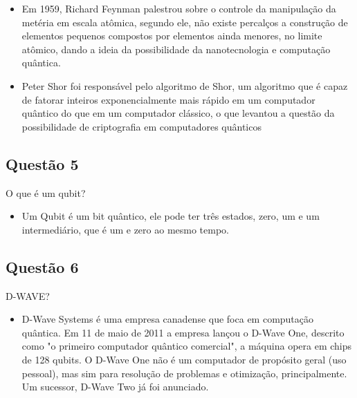 \documentclass{article}
\begin{document}
        \begin{itemize}
        \item Em 1959, Richard Feynman palestrou sobre o controle da manipulação da metéria em escala atômica, segundo ele, não existe percalços a construção de elementos pequenos compostos por elementos ainda menores, no limite atômico, dando a ideia da possibilidade da nanotecnologia e computação quântica.
        \end{itemize}
        
        \begin{itemize}
        \item Peter Shor foi responsável pelo algoritmo de Shor, um algoritmo que é capaz de fatorar inteiros exponencialmente mais rápido em um computador quântico do que em um computador clássico, o que levantou a questão da possibilidade de criptografia em computadores quânticos
        \end{itemize}
        
\subsection*{Questão 5}
O que é um qubit?
        \begin{itemize}
        \item Um Qubit é um bit quântico, ele pode ter três estados, zero, um e um intermediário, que é um e zero ao mesmo tempo.
        \end{itemize}

\subsection*{Questão 6}
D-WAVE?
        \begin{itemize}
        \item D-Wave Systems é uma empresa canadense que foca em computação quântica. Em 11 de maio de 2011 a empresa lançou o D-Wave One, descrito como "o primeiro computador quântico comercial", a máquina opera em chips de 128 qubits. O D-Wave One não é um computador de propósito geral (uso pessoal), mas sim para resolução de problemas e otimização, principalmente. Um sucessor, D-Wave Two já foi anunciado. 
        \end{itemize}
\end{document}
